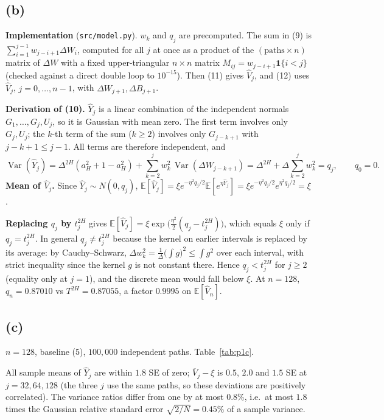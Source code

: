 \documentclass[10pt]{article}
\newcommand{\E}{\mathbb{E}}
\newcommand{\Var}{\operatorname{Var}}
\newcommand{\Yh}{\widehat Y}
\newcommand{\Vh}{\widehat V}
\newcommand{\R}{../results}
\begin{document}
\subsection*{(b)}
\textbf{Implementation} (\texttt{src/model.py}). $w_k$ and $q_j$ are precomputed. The sum in (9) is
$\sum_{i=1}^{j-1}w_{j-i+1}\Delta W_i$, computed for all $j$ at once as a product of the
$(\text{paths}\times n)$ matrix of $\Delta W$ with a fixed upper-triangular $n\times n$ matrix
$M_{ij}=w_{j-i+1}\mathbf 1\{i<j\}$ (checked against a direct double loop to $10^{-15}$). Then (11)
gives $\Vh_j$, and (12) uses $\Vh_j$, $j=0,\dots,n-1$, with $\Delta W_{j+1},\Delta B_{j+1}$.

\textbf{Derivation of (10).} $\Yh_j$ is a linear combination of the independent normals
$G_1,\dots,G_j,U_j$, so it is Gaussian with mean zero. The first term involves only $G_j,U_j$; the
$k$-th term of the sum ($k\ge2$) involves only $G_{j-k+1}$ with $j-k+1\le j-1$. All terms are
therefore independent, and
\[
\Var(\Yh_j)=\Delta^{2H}(a_H^2+1-a_H^2)+\sum_{k=2}^j w_k^2\,\Var(\Delta W_{j-k+1})
=\Delta^{2H}+\Delta\sum_{k=2}^j w_k^2=q_j,\qquad q_0=0.
\]
\textbf{Mean of $\Vh_j$.} Since $\Yh_j\sim N(0,q_j)$,
$\E[\Vh_j]=\xi e^{-\eta^2q_j/2}\E[e^{\eta\Yh_j}]=\xi e^{-\eta^2q_j/2}e^{\eta^2q_j/2}=\xi$.

\textbf{Replacing $q_j$ by $t_j^{2H}$} gives $\E[\Vh_j]=\xi\exp\!\big(\tfrac{\eta^2}{2}(q_j-t_j^{2H})\big)$,
which equals $\xi$ only if $q_j=t_j^{2H}$. In general $q_j\neq t_j^{2H}$ because the kernel on
earlier intervals is replaced by its average: by Cauchy--Schwarz,
$\Delta w_k^2=\frac1\Delta\big(\int g\big)^2\le\int g^2$ over each interval, with strict inequality
since the kernel $g$ is not constant there. Hence $q_j<t_j^{2H}$ for $j\ge2$ (equality only at
$j=1$), and the discrete mean would fall below $\xi$. At $n=128$, $q_n=0.87010$ vs $T^{2H}=0.87055$,
a factor $0.9995$ on $\E[\Vh_n]$.

\subsection*{(c)}
$n=128$, baseline (5), $100{,}000$ independent paths. Table~\ref{tab:p1c}.
\begin{table}[H]\centering\small

\caption{Sample moments of $\Yh_j$ and $\Vh_j$; SE $=s/\sqrt{100{,}000}$. Targets: $\E\Yh_j=0$,
$\Var\Yh_j=q_j$, $\E\Vh_j=\xi=0.04$.}\label{tab:p1c}
\end{table}
All sample means of $\Yh_j$ are within $1.8$ SE of zero; $\overline V_j-\xi$ is $0.5$, $2.0$ and $1.5$ SE
at $j=32,64,128$ (the three $j$ use the same paths, so these deviations are positively
correlated). The variance ratios differ from one by at most $0.8\%$, i.e.\ at most $1.8$ times the
Gaussian relative standard error $\sqrt{2/N}=0.45\%$ of a sample variance.
\end{document}

